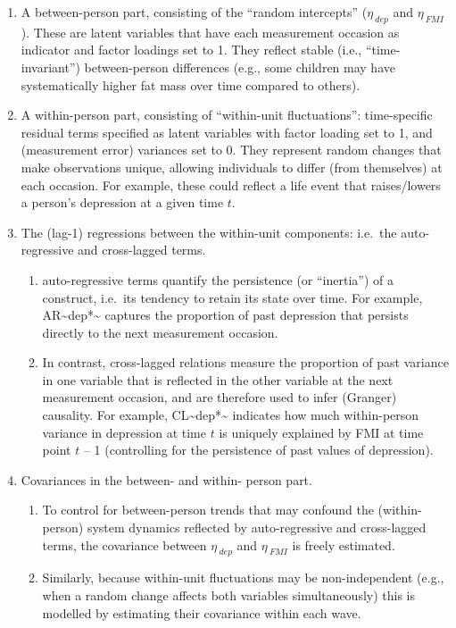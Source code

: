 \documentclass[
  letterpaper,
  DIV=11,
  numbers=noendperiod]{scrreport}
\providecommand{\tightlist}{%
  \setlength{\itemsep}{0pt}\setlength{\parskip}{0pt}}
\begin{document}
\begin{enumerate}
\def\labelenumi{\arabic{enumi}.}
\tightlist
\item
  A between-person part, consisting of the ``random intercepts''
  (\(η_{\ dep}\) and \(η_{\ FMI}\)). These are latent variables that
  have each measurement occasion as indicator and factor loadings set to
  1. They reflect stable (i.e., ``time-invariant'') between-person
  differences (e.g., some children may have systematically higher fat
  mass over time compared to others).
\item
  A within-person part, consisting of ``within-unit fluctuations'':
  time-specific residual terms specified as latent variables with factor
  loading set to 1, and (measurement error) variances set to 0. They
  represent random changes that make observations unique, allowing
  individuals to differ (from themselves) at each occasion. For example,
  these could reflect a life event that raises/lowers a person's
  depression at a given time \(t\).
\item
  The (lag-1) regressions between the within-unit components: i.e.~the
  auto-regressive and cross-lagged terms.

  \begin{enumerate}
  \def\labelenumii{\alph{enumii})}
  \tightlist
  \item
    auto-regressive terms quantify the persistence (or ``inertia'') of a
    construct, i.e.~its tendency to retain its state over time. For
    example, AR\textasciitilde* dep*\textasciitilde{} captures the
    proportion of past depression that persists directly to the next
    measurement occasion.
  \item
    In contrast, cross-lagged relations measure the proportion of past
    variance in one variable that is reflected in the other variable at
    the next measurement occasion, and are therefore used to infer
    (Granger) causality. For example, CL\textasciitilde*
    dep*\textasciitilde{} indicates how much within-person variance in
    depression at time \(t\) is uniquely explained by FMI at time point
    \(t\) -- 1 (controlling for the persistence of past values of
    depression).
  \end{enumerate}
\item
  Covariances in the between- and within- person part.

  \begin{enumerate}
  \def\labelenumii{\alph{enumii})}
  \tightlist
  \item
    To control for between-person trends that may confound the
    (within-person) system dynamics reflected by auto-regressive and
    cross-lagged terms, the covariance between \(η_{\ dep}\) and
    \(η_{\ FMI}\) is freely estimated.
  \item
    Similarly, because within-unit fluctuations may be non-independent
    (e.g., when a random change affects both variables simultaneously)
    this is modelled by estimating their covariance within each wave.
  \end{enumerate}
\end{enumerate}
\end{document}
